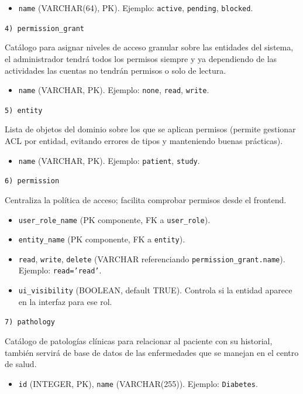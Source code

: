 \documentclass[12pt, a4paper]{article}
\begin{document}
\begin{itemize}
	\item \texttt{name} (VARCHAR(64), PK). Ejemplo: \texttt{active}, \texttt{pending}, \texttt{blocked}.
\end{itemize}


\texttt{4) permission\_grant}

Catálogo para asignar niveles de acceso granular sobre las entidades del sistema, el administrador tendrá todos los permisos siempre y ya dependiendo de las actividades las cuentas no tendrán permisos o solo de lectura.


\begin{itemize}
	\item \texttt{name} (VARCHAR, PK). Ejemplo: \texttt{none}, \texttt{read}, \texttt{write}.
\end{itemize}

\texttt{5) entity}

Lista de objetos del dominio sobre los que se aplican permisos (permite gestionar ACL por entidad, evitando errores de tipos y manteniendo buenas prácticas).

\begin{itemize}
	\item \texttt{name} (VARCHAR, PK). Ejemplo: \texttt{patient}, \texttt{study}.
\end{itemize}



\texttt{6) permission}

Centraliza la política de acceso; facilita comprobar permisos desde el frontend.
\begin{itemize}
	\item \texttt{user\_role\_name} (PK componente, FK a \texttt{user\_role}).
	\item \texttt{entity\_name} (PK componente, FK a \texttt{entity}).
	\item \texttt{read}, \texttt{write}, \texttt{delete} (VARCHAR referenciando \texttt{permission\_grant.name}). Ejemplo: \texttt{read='read'}.
	\item \texttt{ui\_visibility} (BOOLEAN, default TRUE). Controla si la entidad aparece en la interfaz para ese rol.
\end{itemize}





\texttt{7) pathology}

Catálogo de patologías clínicas para relacionar al paciente con su historial, también servirá de base de datos de las enfermedades que se manejan en el centro de salud.
\begin{itemize}
	\item \texttt{id} (INTEGER, PK), \texttt{name} (VARCHAR(255)). Ejemplo: \texttt{Diabetes}.
\end{itemize}
\end{document}
